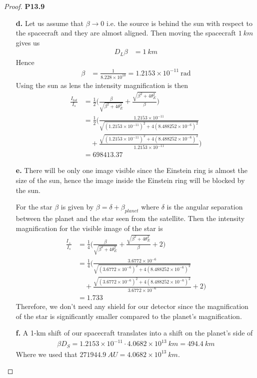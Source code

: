 \documentclass[11pt]{article}
\theoremstyle{definition}
\begin{document}
\begin{proof}{\textbf{P13.9}}
\begin{itemize}
\cleardoublepage
\item [\textbf{d.}]
Let us assume that $\beta \to 0$ i.e. the source is behind the sun with respect
to the spacecraft and they are almost aligned.
Then moving the spacecraft $1~km$ gives us
\begin{align*}
    D_L \beta &= 1~km
\end{align*}
Hence
\begin{align*}
    \beta &= \frac{1}{8.228 \times 10^{10}} = 1.2153 \times 10^{-11}~\text{rad}
\end{align*}
Using the sun as lens the intensity magnification is then
\begin{align*}
    \frac{I_{tot}}{I_s}
    &= \frac{1}{2}\bigg(\frac{\beta}{\sqrt{\beta^2 + 4\theta_E^2}}
    + \frac{\sqrt{\beta^2 + 4\theta_E^2}}{\beta}
    \bigg)\\
    &= \frac{1}{2}\bigg(
    \frac{1.2153 \times 10^{-11}}
    {\sqrt{(1.2153 \times 10^{-11})^2 + 4(8.488252 \times 10^{-6})^2}}\\
    &\quad
    + \frac{\sqrt{(1.2153 \times 10^{-11})^2 + 4(8.488252 \times 10^{-6})^2}}
    {1.2153 \times 10^{-11}}
    \bigg)\\
    &= 698413.37
\end{align*}

\item [\textbf{e.}] There will be only one image visible since the Einstein
ring is almost the size of the sun, hence the image inside the Einstein ring
will be blocked by the sun.

For the star $\beta$ is given by $\beta = \delta + \beta_{planet}$ where
$\delta$ is the angular separation between the planet and the star seen from
the satellite. Then the intensity magnification for the visible image of the
star is
\begin{align*}
    \frac{I_+}{I_s}
    &= \frac{1}{4}\bigg(\frac{\beta}{\sqrt{\beta^2 + 4\theta_E^2}}
    + \frac{\sqrt{\beta^2 + 4\theta_E^2}}{\beta} + 2
    \bigg)\\
    &= \frac{1}{4}\bigg(
    \frac{3.6772\times 10^{-6}}
    {\sqrt{(3.6772\times 10^{-6})^2 + 4(8.488252 \times 10^{-6})^2}}\\
    &\quad
    + \frac{\sqrt{(3.6772\times 10^{-6})^2 + 4(8.488252 \times 10^{-6})^2}}
    {3.6772\times 10^{-6}} + 2
    \bigg)\\
    &= 1.733
\end{align*}
Therefore, we don't need any shield for our detector since the
magnification of the star is significantly smaller compared to the planet's
magnification.

\item [\textbf{f.}] A 1-km shift of our spacecraft translates into a shift on
the planet's side of
\begin{align*}
    \beta D_S = 1.2153\times 10^{-11} \cdot 4.0682 \times 10^{13}~km = 494.4~km
\end{align*}
Where we used that $271944.9~AU = 4.0682 \times 10^{13}~km$.
\end{itemize}
\end{proof}
\end{document}
